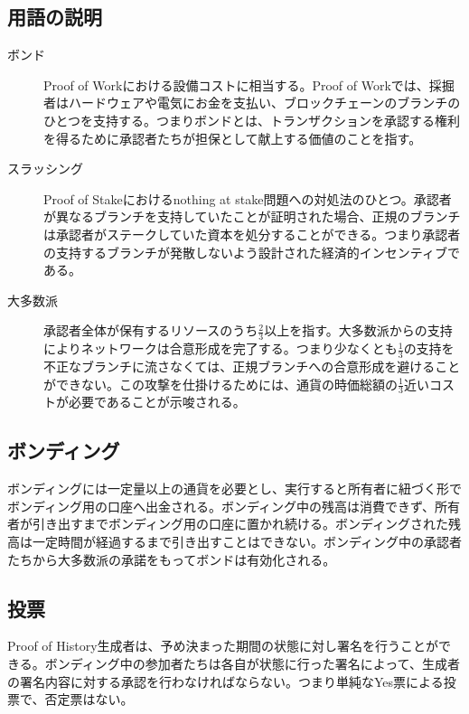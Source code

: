 \documentclass[12pt]{ltjsarticle}
\begin{document}
\subsection{用語の説明}
\begin{description}

\item[ボンド]
Proof of Workにおける設備コストに相当する。Proof of Workでは、採掘者はハードウェアや電気にお金を支払い、ブロックチェーンのブランチのひとつを支持する。つまりボンドとは、トランザクションを承認する権利を得るために承認者たちが担保として献上する価値のことを指す。

\item[スラッシング]

Proof of Stakeにおけるnothing at stake問題への対処法のひとつ\cite{slasher}。承認者が異なるブランチを支持していたことが証明された場合、正規のブランチは承認者がステークしていた資本を処分することができる。つまり承認者の支持するブランチが発散しないよう設計された経済的インセンティブである。

\item[大多数派]
承認者全体が保有するリソースのうち\(\frac{2}{3}\)以上を指す。大多数派からの支持によりネットワークは合意形成を完了する。つまり少なくとも\(\frac{1}{3}\)の支持を不正なブランチに流さなくては、正規ブランチへの合意形成を避けることができない。この攻撃を仕掛けるためには、通貨の時価総額の\(\frac{1}{3}\)近いコストが必要であることが示唆される。

\end{description}

\subsection{ボンディング}
ボンディングには一定量以上の通貨を必要とし、実行すると所有者に紐づく形でボンディング用の口座へ出金される。ボンディング中の残高は消費できず、所有者が引き出すまでボンディング用の口座に置かれ続ける。ボンディングされた残高は一定時間が経過するまで引き出すことはできない。ボンディング中の承認者たちから大多数派の承諾をもってボンドは有効化される。

\subsection{投票}
Proof of History生成者は、予め決まった期間の状態に対し署名を行うことができる。ボンディング中の参加者たちは各自が状態に行った署名によって、生成者の署名内容に対する承認を行わなければならない。つまり単純なYes票による投票で、否定票はない。
\end{document}
